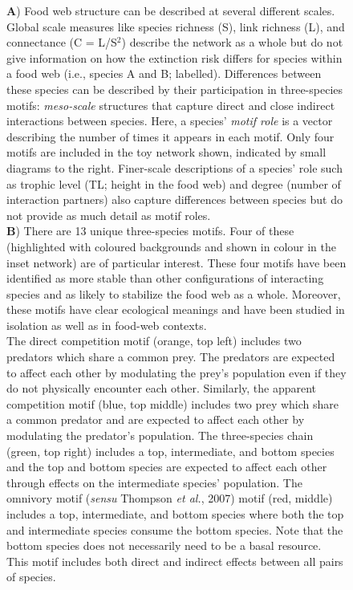 \documentclass[12pt]{article}
\begin{document}
   \begin{figure}[hb!]
        \centering
        \caption{\small \textbf{A}) Food web structure can be described at several different scales. Global scale measures like species richness (S), link richness (L), and connectance (C = L/S$^2$) describe the network as a whole but do not give information on how the extinction risk differs for species within a food web (i.e., species A and B; labelled). Differences between these species can be described by their participation in three-species motifs: \emph{meso-scale} structures that capture direct and close indirect interactions between species. Here, a species' \emph{motif role} is a vector describing the number of times it appears in each motif. Only four motifs are included in the toy network shown, indicated by small diagrams to the right. Finer-scale descriptions of a species' role such as trophic level (TL; height in the food web) and degree (number of interaction partners) also capture differences between species but do not provide as much detail as motif roles.\\
        \textbf{B}) There are 13 unique three-species motifs. Four of these (highlighted with coloured backgrounds and shown in colour in the inset network) are of particular interest. These four motifs have been identified as more stable than other configurations of interacting species and as likely to stabilize the food web as a whole. Moreover, these motifs have clear ecological meanings and have been studied in isolation as well as in food-web contexts.\\
        The direct competition motif (orange, top left) includes two predators which share a common prey. The predators are expected to affect each other by modulating the prey's population even if they do not physically encounter each other. Similarly, the apparent competition motif (blue, top middle) includes two prey which share a common predator and are expected to affect each other by modulating the predator's population. 
        The three-species chain (green, top right) includes a top, intermediate, and bottom species and the top and bottom species are expected to affect each other through effects on the intermediate species' population. The omnivory motif (\emph{sensu} Thompson \emph{et al.}, 2007) motif (red, middle) includes a top, intermediate, and bottom species where both the top and intermediate species consume the bottom species. Note that the bottom species does not necessarily need to be a basal resource. This motif includes both direct and indirect effects between all pairs of species.}
        \label{motifs}
    \end{figure}
\end{document}

